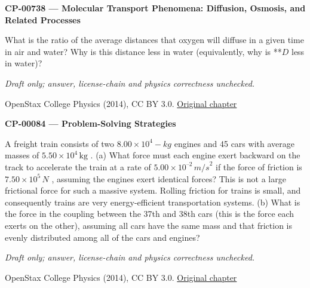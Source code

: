 \par\medskip
\noindent\textbf{CP-00738 — Molecular Transport Phenomena: Diffusion, Osmosis, and Related Processes}
\par What is the ratio of the average distances that oxygen will diffuse in a given time in air and water? Why is this distance less in water (equivalently, why is **$D$ less in water)?
\par\smallskip
\textit{Draft only; answer, license-chain and physics correctness unchecked.}
\par{\footnotesize OpenStax College Physics (2014), CC BY 3.0. \href{https://github.com/philschatz/physics-book/blob/a7efaa7e221fab1694022d8bb98b83a73ee31d3d/contents/m42212.md}{Original chapter}}\par\normalsize

\par\medskip
\noindent\textbf{CP-00084 — Problem-Solving Strategies}
\par A freight train consists of two $8.00\times{}{10}^{4}-kg$ engines and 45 cars with average masses of $5.50\times{}{10}^{4}\,\mathrm{kg}$ . (a) What force must each engine exert backward on the track to accelerate the train at a rate of $5.00\times{}{10}^{–2}\,{m/s}^{2}$ if the force of friction is $7.50\times{}{10}^{5}\,N$ , assuming the engines exert identical forces? This is not a large frictional force for such a massive system. Rolling friction for trains is small, and consequently trains are very energy-efficient transportation systems. (b) What is the force in the coupling between the 37th and 38th cars (this is the force each exerts on the other), assuming all cars have the same mass and that friction is evenly distributed among all of the cars and engines?
\par\smallskip
\textit{Draft only; answer, license-chain and physics correctness unchecked.}
\par{\footnotesize OpenStax College Physics (2014), CC BY 3.0. \href{https://github.com/philschatz/physics-book/blob/a7efaa7e221fab1694022d8bb98b83a73ee31d3d/contents/m42076.md}{Original chapter}}\par\normalsize

